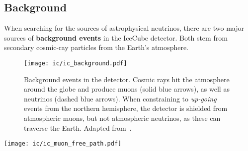 \subsection{Background}\label{background}

When searching for the sources of astrophysical neutrinos, there are two major sources of \textbf{background events} in the IceCube detector. Both stem from secondary cosmic-ray particles from the Earth's atmosphere.

\begin{figure}[htb]
    \texttt{[image: ic/ic\_background.pdf]}
    \caption[Background events]{Background events in the detector. Cosmic rays hit the atmosphere around the globe and produce muons (solid blue arrows), as well as neutrinos (dashed blue arrows). When constraining to \textit{up-going} events from the northern hemisphere, the detector is shielded from atmospheric muons, but not atmospheric neutrinos, as these can traverse the Earth. Adapted from~\cite{Ahlers2018a}.}
\end{figure}

\begin{marginfigure}
    \texttt{[image: ic/ic\_muon\_free\_path.pdf]}
    \caption[Muon free path in ice]{Free path length for \SI{1}{\peta\eV} muons in ice. The mean free path in ice is slightly longer than in rock. From~\cite{Chirkin2004}.}
\end{marginfigure}

